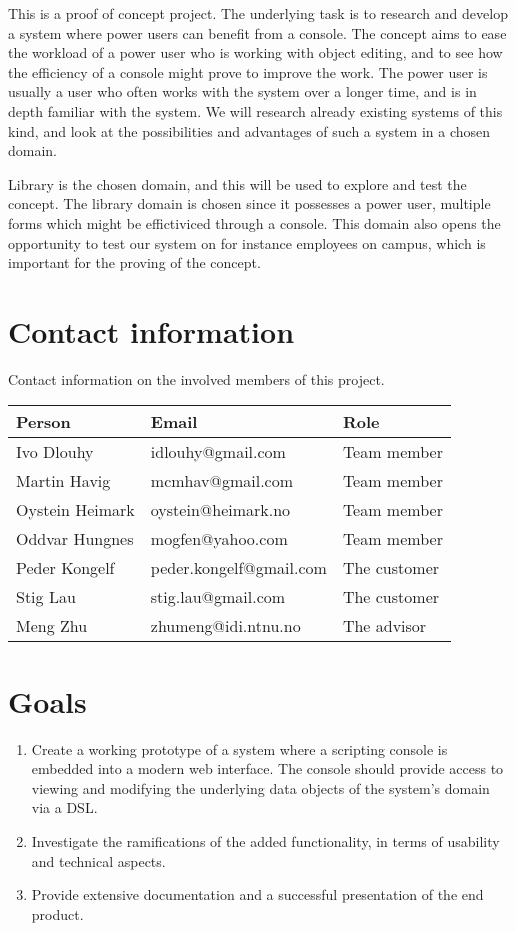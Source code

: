 This is a proof of concept project. The underlying task is to research and develop a system where power users can benefit from a console.  The concept aims to ease the workload of a power user who is working with object editing, and to see how the efficiency of a console might prove to improve the work. The power user is usually a user who often works with the system over a longer time, and is in depth familiar with the system. We will research already existing systems of this kind, and look at the possibilities and advantages of such a system in a chosen domain.

Library is the chosen domain, and this will be used to explore and test the concept. The library domain is chosen since it possesses a power user, multiple forms which might be effictiviced through a console. This domain also opens the opportunity to test our system on for instance employees on campus, which is important for the proving of the concept.


\section{Contact information}
Contact information on the involved members of this project.
\begin{table}
    \begin{tabular}{ | l | l | l | }
      \hline
      \textbf{Person} & \textbf{Email} & \textbf{Role} \\ \hline
      Ivo Dlouhy & idlouhy@gmail.com & Team member \\ \hline
      Martin Havig & mcmhav@gmail.com & Team member \\ \hline
      Oystein Heimark & oystein@heimark.no & Team member \\ \hline
      Oddvar Hungnes & mogfen@yahoo.com & Team member \\ \hline
      Peder Kongelf & peder.kongelf@gmail.com & The customer \\ \hline
      Stig Lau & stig.lau@gmail.com & The customer \\ \hline
      Meng Zhu & zhumeng@idi.ntnu.no & The advisor \\ \hline
    \end{tabular}
\end{table}

\section{Goals}
\begin{enumerate}
  \item Create a working prototype of a system where a scripting console is embedded into a modern web interface. The console should provide access to viewing and modifying the underlying data objects of the system's domain via a DSL.
  \item Investigate the ramifications of the added functionality, in terms of usability and technical aspects.
  \item Provide extensive documentation and a successful presentation of the end product.
\end{enumerate}

